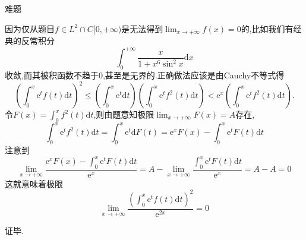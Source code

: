\documentclass[UTF8,no-math,12pt,openany,table,dvipsnames,svgnames]{book}
\newcommand{\hei}{\CJKfamily{hei}}
\newenvironment{Proof}{\par\indent{\hei 证明}\hspace{1em}}{\par}
\newenvironment{solve}{\par\indent{\hei 解}\hspace{1em}}{\par}
\renewcommand{\le}{\leqslant}
\begin{document}
\begin{MYBOX}[colbacktitle=blue]{难题}
\begin{Proof}
\[\]
因为仅从题目$f\in L^2\cap C[0,+\infty)$是无法得到$\lim_{x\to+\infty}f(x)=0$的,比如我们有经典的反常积分
\[
\int_0^{+\infty}{\frac{x}{1+x^6\sin ^2x}\text{d}x}
\]
收敛,而其被积函数不趋于$0$,甚至是无界的.正确做法应该是由Cauchy不等式得
\[
\left( \int_0^x{\text{e}^tf\left( t \right) \text{d}t} \right) ^2\leqslant \left( \int_0^x{\text{e}^t\text{d}t} \right) \left( \int_0^x{\text{e}^tf^2\left( t \right) \text{d}t} \right) <\text{e}^x\left( \int_0^x{\text{e}^tf^2\left( t \right) \text{d}t} \right).
\]
令$F\left( x \right) =\int_0^x{f^2\left( t \right) \text{d}t}$,则由题意知极限$\lim_{x\to+\infty}F(x)=A$存在,
\[
\int_0^x{\text{e}^tf^2\left( t \right) \text{d}t}=\int_0^x{\text{e}^t\text{d}F\left( t \right)}=\text{e}^xF\left( x \right) -\int_0^x{\text{e}^tF\left( t \right) \text{d}t}
\]
注意到\[
\lim_{x\rightarrow +\infty} \frac{\text{e}^xF\left( x \right) -\int_0^x{\text{e}^tF\left( t \right) \text{d}t}}{\text{e}^x}=A-\lim_{x\rightarrow +\infty} \frac{\int_0^x{\text{e}^tF\left( t \right) \text{d}t}}{\text{e}^x}=A-A=0
\]
这就意味着极限
\[
\lim_{x\rightarrow +\infty} \frac{\left( \int_0^x{\text{e}^tf\left( t \right) \text{d}t} \right) ^2}{\text{e}^{2x}}=0
\]

证毕.


\end{Proof}

\end{MYBOX}
\end{document}
